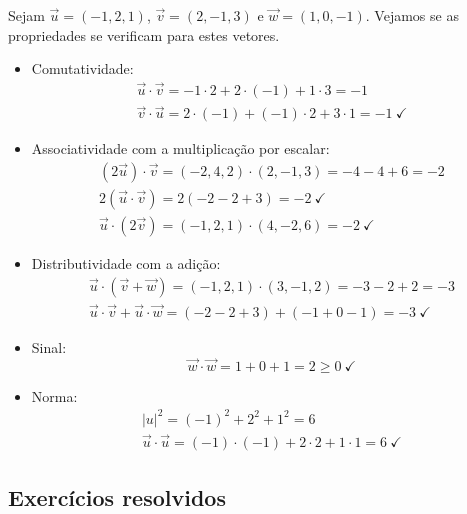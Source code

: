 \begin{ex}
  Sejam $\vec{u}=(-1,2,1)$, $\vec{v}=(2,-1,3)$ e $\vec{w}=(1,0,-1)$. Vejamos se as propriedades se verificam para estes vetores.
  \begin{itemize}
  \item Comutatividade:
    \begin{gather}
      \vec{u}\cdot\vec{v} = -1\cdot 2 + 2\cdot (-1) + 1\cdot 3 = -1\\
      \vec{v}\cdot\vec{u} = 2\cdot(-1) + (-1)\cdot 2 + 3\cdot 1 = -1~\checkmark
    \end{gather}
  \item Associatividade com a multiplicação por escalar:
    \begin{gather}
      (2\vec{u})\cdot\vec{v} = (-2,4,2)\cdot(2,-1,3) = -4-4+6=-2\\
      2(\vec{u}\cdot\vec{v}) = 2(-2-2+3) = -2~\checkmark\\
      \vec{u}\cdot(2\vec{v}) = (-1,2,1)\cdot(4,-2,6) = -2~\checkmark
    \end{gather}
  \item Distributividade com a adição:
    \begin{gather}
      \vec{u}\cdot(\vec{v}+\vec{w}) = (-1,2,1)\cdot(3,-1,2) = -3-2+2=-3\\
      \vec{u}\cdot\vec{v}+\vec{u}\cdot\vec{w} = (-2-2+3)+(-1+0-1) = -3~\checkmark
    \end{gather}
  \item Sinal:
    \begin{equation}
      \vec{w}\cdot\vec{w} = 1+0+1 = 2 \geq 0~\checkmark
    \end{equation}
  \item Norma:
    \begin{gather}
      |u|^2 = (-1)^2+2^2+1^2 = 6\\
      \vec{u}\cdot\vec{u} = (-1)\cdot(-1)+2\cdot 2+1\cdot 1 = 6~\checkmark
    \end{gather}
  \end{itemize}
\end{ex}

\subsection*{Exercícios resolvidos}

